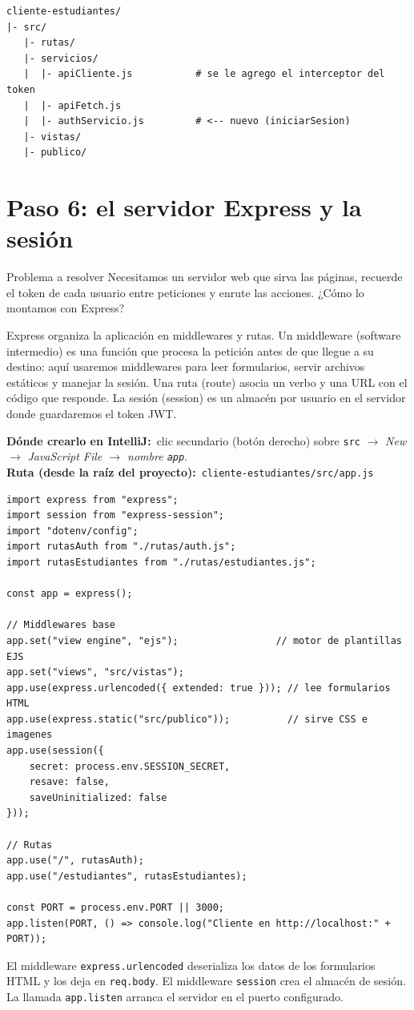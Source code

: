 \documentclass[11pt]{article}
\newcommand{\dondecrear}[3]{\begin{ubic}{\footnotesize\textbf{\color{ndverdeo}D\'onde crearlo en IntelliJ:}~clic secundario (bot\'on derecho) sobre \texttt{#1} $\rightarrow$ \emph{New} $\rightarrow$ \emph{#2}.\\[2pt]\textbf{\color{ndverdeo}Ruta (desde la ra\'iz del proyecto):}~\texttt{#3}}\end{ubic}\nobreak\vspace{3pt}}
\begin{document}
\begin{cajacodigo}
\begin{lstlisting}[style=markup]
cliente-estudiantes/
|- src/
   |- rutas/
   |- servicios/
   |  |- apiCliente.js           # se le agrego el interceptor del token
   |  |- apiFetch.js
   |  |- authServicio.js         # <-- nuevo (iniciarSesion)
   |- vistas/
   |- publico/
\end{lstlisting}
\end{cajacodigo}
\vspace{2pt}

\section{Paso 6: el servidor Express y la sesión}
\begin{cajaproblema}{Problema a resolver}
Necesitamos un servidor web que sirva las páginas, recuerde el token de cada usuario entre peticiones y enrute las acciones. ¿Cómo lo montamos con Express?\par
\end{cajaproblema}
Express organiza la aplicación en middlewares y rutas. Un middleware (software intermedio) es una función que procesa la petición antes de que llegue a su destino: aquí usaremos middlewares para leer formularios, servir archivos estáticos y manejar la sesión. Una ruta (route) asocia un verbo y una URL con el código que responde. La sesión (session) es un almacén por usuario en el servidor donde guardaremos el token JWT.

\dondecrear{src}{JavaScript File $\rightarrow$ nombre \texttt{app}}{cliente-estudiantes/src/app.js}
\begin{cajacodigo}
\begin{lstlisting}[style=js]
import express from "express";
import session from "express-session";
import "dotenv/config";
import rutasAuth from "./rutas/auth.js";
import rutasEstudiantes from "./rutas/estudiantes.js";

const app = express();

// Middlewares base
app.set("view engine", "ejs");                 // motor de plantillas EJS
app.set("views", "src/vistas");
app.use(express.urlencoded({ extended: true })); // lee formularios HTML
app.use(express.static("src/publico"));          // sirve CSS e imagenes
app.use(session({
	secret: process.env.SESSION_SECRET,
	resave: false,
	saveUninitialized: false
}));

// Rutas
app.use("/", rutasAuth);
app.use("/estudiantes", rutasEstudiantes);

const PORT = process.env.PORT || 3000;
app.listen(PORT, () => console.log("Cliente en http://localhost:" + PORT));
\end{lstlisting}
\end{cajacodigo}
\vspace{2pt}
El middleware \texttt{express.\allowbreak{}urlencoded} deserializa los datos de los formularios HTML y los deja en \texttt{req.\allowbreak{}body}. El middleware \texttt{session} crea el almacén de sesión. La llamada \texttt{app.\allowbreak{}listen} arranca el servidor en el puerto configurado.
\end{document}
